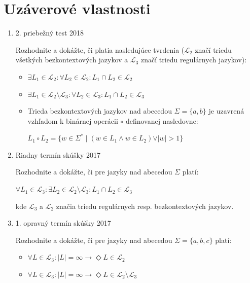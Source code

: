 \documentclass[]{article}
\begin{document}
	\section{Uzáverové vlastnosti}
	\begin{enumerate}
		\item 2. priebežný test 2018
	
		Rozhodnite a dokážte, či platia nasledujúce tvrdenia ($\mathcal{L}_2$ značí triedu všetkých bezkontextových jazykov a $\mathcal{L}_3$ značí triedu regulárnych jazykov):
		
		\begin{itemize}
			\item $\exists L_1 \in \mathcal{L}_2: \forall L_2 \in \mathcal{L}_2: L_1 \cap L_2 \in \mathcal{L}_2$
			
			\item $\exists L_1 \in \mathcal{L}_2 \setminus \mathcal{L}_3: \forall L_2 \in \mathcal{L}_3: L_1 \cap L_2 \in \mathcal{L}_3$
			
			\item Trieda bezkontextových jazykov nad abecedou $\Sigma = \{a,b\}$ je uzavrená vzhľadom k binárnej operácii $\circ$ definovanej nasledovne:
			
			$L_1 \circ L_2 = \{w \in \Sigma^* \mid (w \in L_1 \land w \in L_2) \lor \vert w \vert > 1\}$
		\end{itemize}

		\item Riadny termín skúšky 2017
	
		Rozhodnite a dokážte, či pre jazyky nad abecedou $\Sigma$ platí:
		
		$\forall L_1 \in \mathcal{L}_3: \exists L_2 \in \mathcal{L}_2 \setminus \mathcal{L}_3: L_1 \cap L_2 \in \mathcal{L}_3$
			
		kde $\mathcal{L}_3$ a $\mathcal{L}_2$ značia triedu regulárnych resp. bezkontextových jazykov.
	
		\item 1. opravný termín skúšky 2017
	
		Rozhodnite a dokážte, či pre jazyky nad abecedou $\Sigma = \{a,b,c\}$ platí:
		
		\begin{itemize}
			\item $\forall L \in \mathcal{L}_3: \vert L \vert = \infty \rightarrow \Diamond L \in  \mathcal{L}_2$
			\item $\forall L \in \mathcal{L}_3: \vert L \vert = \infty \rightarrow \Diamond L \in  \mathcal{L}_2 \setminus \mathcal{L}_3$
		\end{itemize}	
	

\end{enumerate}
\end{document}
